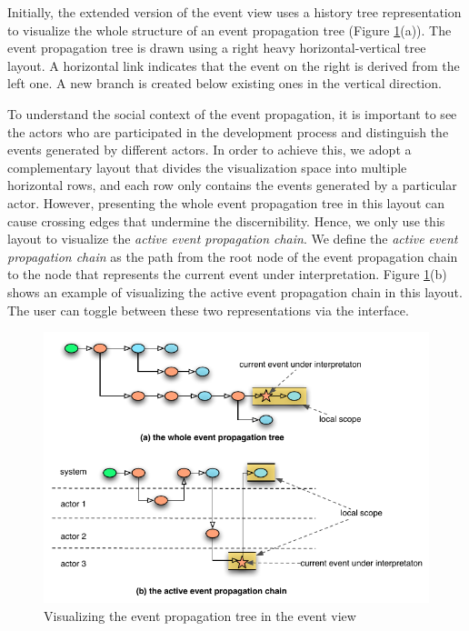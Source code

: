 Initially, the extended version of the event view uses a history tree representation \cite{Shrinivasan2008} to visualize the whole structure of an event propagation tree (Figure \ref{fig:extended_event_view}(a)). The event propagation tree is drawn using a right heavy horizontal-vertical tree layout. A horizontal link indicates that the event on the right is derived from the left one. A new branch is created below existing ones in the vertical direction. 

To understand the social context of the event propagation, it is important to see the actors who are participated in the development process and distinguish the events generated by different actors. In order to achieve this, we adopt a complementary layout that divides the visualization space into multiple horizontal rows, and each row only contains the events generated by a particular actor. However, presenting the whole event propagation tree in this layout can cause crossing edges that undermine the discernibility. Hence, we only use this layout to visualize the \emph{active event propagation chain}. We define the \emph{active event propagation chain} as the path from the root node of the event propagation chain to the node that represents the current event under interpretation. Figure \ref{fig:extended_event_view}(b) shows an example of visualizing the active event propagation chain in this layout. The user can toggle between these two representations via the interface. 

\begin{figure}[htbp] %
	\centering
	\includegraphics{extended_event_view.pdf} 
	\caption{Visualizing the event propagation tree in the event view}
	\label{fig:extended_event_view}
\end{figure}

